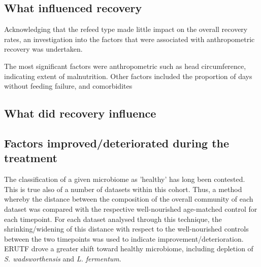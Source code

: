 \documentclass{article}
\begin{document}
\subsection{What influenced recovery}
Acknowledging that the refeed type made little impact on the overall recovery rates, an investigation into the factors that were associated with anthropometric recovery was undertaken.

The most significant factors were anthropometric such as head circumference, indicating extent of malnutrition.
Other factors included the proportion of days without feeding failure, and comorbidites

\subsection{What did recovery influence}

\subsection{Factors improved/deteriorated during the treatment}
The classification of a given microbiome as 'healthy' has long been contested.
This is true also of a number of datasets within this cohort.
Thus, a method whereby the distance between the composition of the overall community of each dataset was compared with the respective well-nourished age-matched control for each timepoint.
For each dataset analysed through this technique, the shrinking/widening of this distance with respect to the well-nourished controls between the two timepoints was used to indicate improvement/deterioration.
ERUTF drove a greater shift toward healthy microbiome, including depletion of \textit{S. wadsworthensis} and \textit{L. fermentum}.
\end{document}
